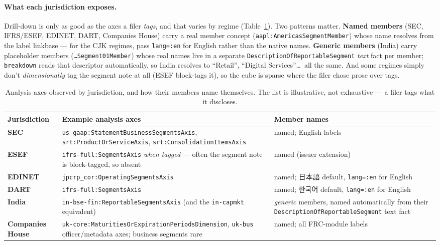 \documentclass[11pt,a4paper]{report}
\begin{document}
\paragraph{What each jurisdiction exposes.} Drill-down is only as good as the axes a filer \emph{tags}, and
that varies by regime (Table~\ref{tab:analysis-axes}). Two patterns matter. \textbf{Named members} (SEC,
IFRS/ESEF, EDINET, DART, Companies House) carry a real member concept (\texttt{aapl:AmericasSegmentMember})
whose name resolves from the label linkbase --- for the CJK regimes, pass \texttt{lang=:en} for English
rather than the native names. \textbf{Generic members} (India) carry placeholder members
(\texttt{…Segment01Member}) whose real names live in a separate \texttt{DescriptionOfReportableSegment}
\emph{text} fact per member; \texttt{breakdown} reads that descriptor automatically, so India resolves to
``Retail'', ``Digital Services''\ldots\ all the same. And some regimes simply don't \emph{dimensionally}
tag the segment note at all (ESEF block-tags it), so the cube is sparse where the filer chose prose over tags.

\begin{table}[h]
\centering
\small
\caption{Analysis axes observed by jurisdiction, and how their members name themselves. The list is
illustrative, not exhaustive --- a filer tags what it discloses.}
\label{tab:analysis-axes}
\begin{tabular}{@{}p{}p{}p{}@{}}
\toprule
\textbf{Jurisdiction} & \textbf{Example analysis axes} & \textbf{Member names} \\
\midrule
\textbf{SEC} & \texttt{us-gaap:StatementBusinessSegmentsAxis}, \texttt{srt:ProductOrServiceAxis}, \texttt{srt:ConsolidationItemsAxis} & named; English labels \\
\textbf{ESEF} & \texttt{ifrs-full:SegmentsAxis} \emph{when tagged} --- often the segment note is block-tagged, so absent & named (issuer extension) \\
\textbf{EDINET} & \texttt{jpcrp\_cor:OperatingSegmentsAxis} & named; 日本語 default, \texttt{lang=:en} for English \\
\textbf{DART} & \texttt{ifrs-full:SegmentsAxis} & named; 한국어 default, \texttt{lang=:en} for English \\
\textbf{India} & \texttt{in-bse-fin:ReportableSegmentsAxis} (and the \texttt{in-capmkt} equivalent) & \emph{generic} members, named automatically from their \texttt{DescriptionOfReportableSegment} text fact \\
\textbf{Companies House} & \texttt{uk-core:MaturitiesOrExpirationPeriodsDimension}, \texttt{uk-bus} officer/metadata axes; business segments rare & named; all FRC-module labels \\
\bottomrule
\end{tabular}
\end{table}
\end{document}
